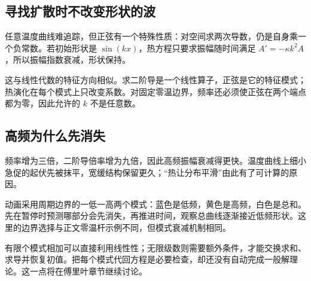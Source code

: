 \subsection*{寻找扩散时不改变形状的波}
任意温度曲线难追踪，但正弦有一个特殊性质：对空间求两次导数，仍是自身乘一个负常数。若初始形状是 $\sin(kx)$，热方程只要求振幅随时间满足 $A'=-\kappa k^2A$，所以振幅指数衰减，形状保持。

这与线性代数的特征方向相似。求二阶导是一个线性算子，正弦是它的特征模式；热演化在每个模式上只改变系数。对固定零温边界，频率还必须使正弦在两个端点都为零，因此允许的 $k$ 不是任意数。

\subsection*{高频为什么先消失}
频率增为三倍，二阶导倍率增为九倍，因此高频振幅衰减得更快。温度曲线上细小急促的起伏先被抹平，宽缓结构保留更久；“热让分布平滑”由此有了可计算的原因。

动画采用周期边界的一低一高两个模式：蓝色是低频，黄色是高频，白色是总和。先在暂停时预测哪部分会先消失，再推进时间，观察总曲线逐渐接近低频形状。这里的边界选择与正文零温杆示例不同，但模式衰减机制相同。

有限个模式相加可以直接利用线性性；无限级数则需要额外条件，才能交换求和、求导并恢复初值。把每个模式代回方程是必要检查，却还没有自动完成一般解理论。这一点将在傅里叶章节继续讨论。
